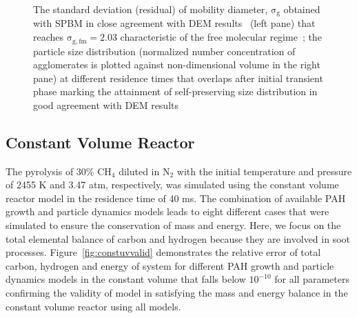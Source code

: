 \begin{figure}[H]
\begin{subfigure}[t]{0.4\textwidth}
	\end{subfigure}
	\caption{The standard deviation (residual) of mobility diameter, $\mathrm{\sigma_g}$ obtained with SPBM in close agreement with DEM results~\citep{kholghy2021surface} (left pane) that reaches $\mathrm{\sigma_{g,fm}=2.03}$ characteristic of the free molecular regime~\citep{vemury1995self}; the particle size distribution (normalized number concentration of agglomerates is plotted against non-dimensional volume in the right pane) at different residence times that overlaps after initial transient phase marking the attainment of self-preserving size distribution in good agreement with DEM results~\citep{goudeli2015coagulation}}
	\label{fig:coagvalid_sigmapsd} 
\end{figure}



\subsection{Constant Volume Reactor}
The pyrolysis of 30\% $\mathrm{CH_4}$ diluted in $\mathrm{N_2}$ with the initial temperature and pressure of 2455 K and 3.47 atm, respectively, was simulated using the constant volume reactor model in the residence time of 40 ms. The combination of available PAH growth and particle dynamics models leads to eight different cases that were simulated to ensure the conservation of mass and energy. Here, we focus on the total elemental balance of carbon and hydrogen because they are involved in soot processes. %
Figure~\ref{fig:constuvvalid} demonstrates the relative error of total carbon, hydrogen and energy of system for different PAH growth and particle dynamics models in the constant volume that falls below $\mathrm{10^{-10}}$ for all parameters confirming the validity of model in satisfying the mass and energy balance in the constant volume reactor using all models. 

